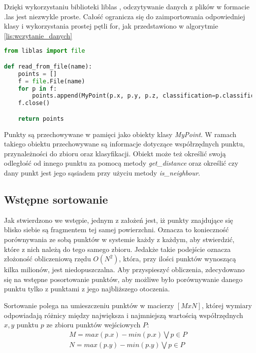 Dzięki wykorzystaniu biblioteki liblas \cite{website:libLASPython}, odczytywanie danych z plików w formacie .las jest niezwykle proste.
Całość ogranicza się do zaimportowania odpowiedniej klasy i wykorzystania prostej pętli for, jak przedstawiono
w algorytmie \ref{lis:wczytanie_danych}

\begin{lstlisting}[frame=L, language=python, caption={Wczytywanie danych}, label={lis:wczytanie_danych}]
from liblas import file

def read_from_file(name):
    points = []
    f = file.File(name)
    for p in f:
        points.append(MyPoint(p.x, p.y, p.z, classification=p.classification))
    f.close()

    return points
\end{lstlisting}

Punkty są przechowywane w pamięci jako obiekty klasy \textit{MyPoint}. W ramach takiego obiektu przechowywane są informacje dotyczące
współrzędnych punktu, przynależności do zbioru oraz klasyfikacji. Obiekt może też określić swoją odległość od innego punktu
za pomocą metody \textit{get\_distance} oraz określić czy dany punkt jest jego sąsiadem przy użyciu metody \textit{is\_neighbour}.

\subsection{Wstępne sortowanie}

Jak stwierdzono we wstępie, jednym z założeń jest, iż punkty znajdujące się blisko siebie są fragmentem tej samej powierzchni.
Oznacza to konieczność porównywania ze sobą punktów w systemie każdy z każdym, aby stwierdzić, które z nich należą do tego samego zbioru.
Jedakże takie podejście oznacza złożoność obliczeniową rzędu $O(N^2)$, która,  przy ilości punktów wynoszącą kilka milionów, jest niedopuszczalna.
Aby przyspieszyć obliczenia, zdecydowano się na wstępne posortowanie punktów, aby możliwe było porównywanie danego punktu tylko z punktami z 
jego najbliższego otoczenia.

Sortowanie polega na umieszczeniu punktów w macierzy $[M x N]$, której wymiary odpowiadają różnicy między największa i najmniejszą wartością
współrzędnych $x, y$ punktu $p$ ze zbioru punktów wejściowych $P$:
\begin{eqnarray}
    M = max(p.x) - min(p.x) \bigvee p \in P \\
    N = max(p.y) - min(p.y) \bigvee p \in P
\end{eqnarray}

